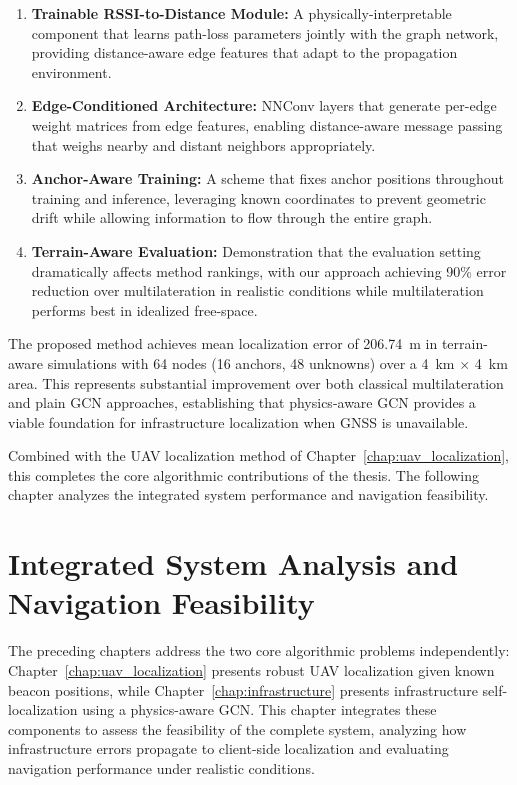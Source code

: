 \documentclass[master,final,11pt]{iscs-thesis}
\begin{document}
\begin{enumerate}
    \item \textbf{Trainable RSSI-to-Distance Module:} A physically-interpretable component that learns path-loss parameters jointly with the graph network, providing distance-aware edge features that adapt to the propagation environment.
    
    \item \textbf{Edge-Conditioned Architecture:} NNConv layers that generate per-edge weight matrices from edge features, enabling distance-aware message passing that weighs nearby and distant neighbors appropriately.
    
    \item \textbf{Anchor-Aware Training:} A scheme that fixes anchor positions throughout training and inference, leveraging known coordinates to prevent geometric drift while allowing information to flow through the entire graph.
    
    \item \textbf{Terrain-Aware Evaluation:} Demonstration that the evaluation setting dramatically affects method rankings, with our approach achieving 90\% error reduction over multilateration in realistic conditions while multilateration performs best in idealized free-space.
\end{enumerate}

The proposed method achieves mean localization error of 206.74~m in terrain-aware simulations with 64 nodes (16 anchors, 48 unknowns) over a 4~km $\times$ 4~km area.
This represents substantial improvement over both classical multilateration and plain GCN approaches, establishing that physics-aware GCN provides a viable foundation for infrastructure localization when GNSS is unavailable.

Combined with the UAV localization method of Chapter~\ref{chap:uav_localization}, this completes the core algorithmic contributions of the thesis.
The following chapter analyzes the integrated system performance and navigation feasibility.

\chapter{Integrated System Analysis and Navigation Feasibility}
\label{chap:integration}

The preceding chapters address the two core algorithmic problems independently: Chapter~\ref{chap:uav_localization} presents robust UAV localization given known beacon positions, while Chapter~\ref{chap:infrastructure} presents infrastructure self-localization using a physics-aware GCN.
This chapter integrates these components to assess the feasibility of the complete system, analyzing how infrastructure errors propagate to client-side localization and evaluating navigation performance under realistic conditions.
\end{document}
